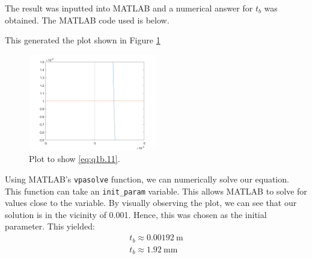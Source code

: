 \documentclass[11pt]{article}
\numberwithin{equation}{section}
\begin{document}
The result was inputted into MATLAB and a numerical answer for $t_b$ was obtained. The MATLAB code used is below.

This generated the plot shown in Figure \ref{q1b2}
\begin{figure}[H]
    \centering
    \includegraphics[width = 0.5\textwidth]{./img/q1b2.png}
    \caption{Plot to show \ref{eq:q1b.11}.}
    \label{q1b2}
\end{figure}
Using MATLAB's \lstinline{vpasolve} function, we can numerically solve our equation. This function can take an \lstinline{init_param} variable. This allows MATLAB to solve for values close to the variable. By visually observing the plot, we can see that our solution is in the vicinity of 0.001. Hence, this was chosen as the initial parameter. This yielded:
\begin{gather}
    t_b \approx \SI{0.00192}{\meter}\\
    t_b \approx \SI{1.92}{\milli\meter}
\end{gather}
\end{document}
